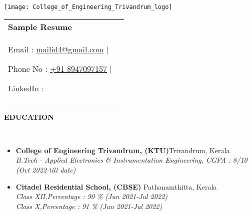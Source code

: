 \documentclass[a4paper,10pt]{article}
\newcommand{\resheading}[1]{{\small \colorbox{mygrey}{\begin{minipage}{0.99\textwidth}{\textbf{#1 \vphantom{p\^{E}}}}\end{minipage}}}}
\begin{document}
\begin{table}
    \begin{minipage}{0.15\linewidth}
        \centering
        \texttt{[image: College\_of\_Engineering\_Trivandrum\_logo]}
    \end{minipage}
    \begin{minipage}{0.1\linewidth}
        \setlength{\tabcolsep}{10pt}
        \def\arraystretch{1.4}
        \begin{tabular}{ll}
            \textbf{\huge{Sample Resume}}   \\ 
            
            {Email : }\href{link  }{mailid4@gmail.com}{  |  }
            
            {Phone No : }\href{tel:number }{+91 8947097157}{  |  }
            
            {LinkedIn : }\href{link }\hspace{4.65cm}

            
        \end{tabular}
    \end{minipage}\hfill
    \vspace{-0.6cm}
\end{table}




\noindent
\resheading{{ EDUCATION}}\\[-0.4cm]

\begin{itemize}

\item \textbf{College of Engineering Trivandrum, (KTU)}\hfill{Trivandrum, Kerala}\\
\emph{B.Tech - Applied Electronics \& Instrumentation Engineering, \hspace{.1cm}CGPA : 8/10} \hfill \emph{(Oct 2022-till date)}

\item \textbf{Citadel Residential School, (CBSE) }\hfill{Pathanamthitta, Kerala} \\
\emph{Class XII,\hspace{.1cm}Percentage : 90 \%} \hfill \emph{(Jun 2021-Jul 2022)}\\
\emph{Class X,\hspace{.33cm}Percentage  : 91 \% } \hfill \emph{(Jun 2021-Jul 2022)}
    \vspace{-0.2cm}
\end{itemize}
\end{document}
